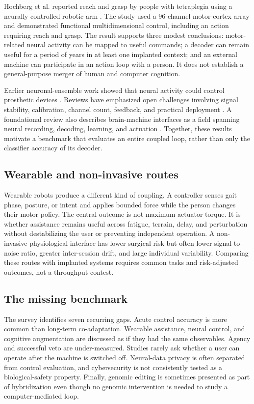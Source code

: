\documentclass[conference]{IEEEtran}
\begin{document}
Hochberg et al. reported reach and grasp by people with tetraplegia using a neurally controlled robotic arm \cite{hochberg2012}. The study used a 96-channel motor-cortex array and demonstrated functional multidimensional control, including an action requiring reach and grasp. The result supports three modest conclusions: motor-related neural activity can be mapped to useful commands; a decoder can remain useful for a period of years in at least one implanted context; and an external machine can participate in an action loop with a person. It does not establish a general-purpose merger of human and computer cognition.

Earlier neuronal-ensemble work showed that neural activity could control prosthetic devices \cite{hochberg2006}. Reviews have emphasized open challenges involving signal stability, calibration, channel count, feedback, and practical deployment \cite{gilja2011}. A foundational review also describes brain-machine interfaces as a field spanning neural recording, decoding, learning, and actuation \cite{lebedev2006}. Together, these results motivate a benchmark that evaluates an entire coupled loop, rather than only the classifier accuracy of its decoder.

\subsection{Wearable and non-invasive routes}

Wearable robots produce a different kind of coupling. A controller senses gait phase, posture, or intent and applies bounded force while the person changes their motor policy. The central outcome is not maximum actuator torque. It is whether assistance remains useful across fatigue, terrain, delay, and perturbation without destabilizing the user or preventing independent operation. A non-invasive physiological interface has lower surgical risk but often lower signal-to-noise ratio, greater inter-session drift, and large individual variability. Comparing these routes with implanted systems requires common tasks and risk-adjusted outcomes, not a throughput contest.

\subsection{The missing benchmark}

The survey identifies seven recurring gaps. Acute control accuracy is more common than long-term co-adaptation. Wearable assistance, neural control, and cognitive augmentation are discussed as if they had the same observables. Agency and successful veto are under-measured. Studies rarely ask whether a user can operate after the machine is switched off. Neural-data privacy is often separated from control evaluation, and cybersecurity is not consistently tested as a biological-safety property. Finally, genomic editing is sometimes presented as part of hybridization even though no genomic intervention is needed to study a computer-mediated loop.
\end{document}
